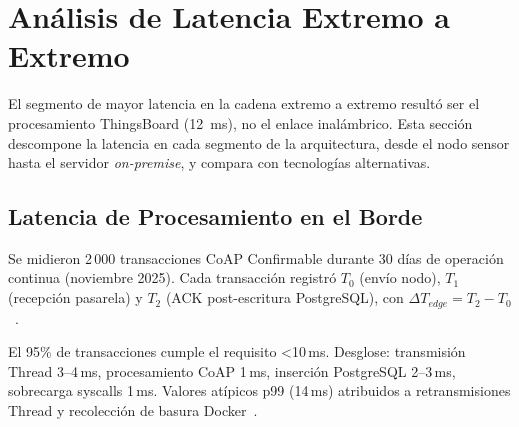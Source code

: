 \section{Análisis de Latencia Extremo a Extremo}
\label{sec:resultados-latencia}

El segmento de mayor latencia en la cadena extremo a extremo resultó ser el procesamiento ThingsBoard (12~ms), no el enlace inalámbrico. Esta sección descompone la latencia en cada segmento de la arquitectura, desde el nodo sensor hasta el servidor \emph{on-premise}, y compara con tecnologías alternativas.



\subsection{Latencia de Procesamiento en el Borde}
\label{sec:resultados-latencia-edge}

Se midieron 2\,000 transacciones CoAP Confirmable durante 30 días de operación continua (noviembre 2025). Cada transacción registró $T_0$ (envío nodo), $T_1$ (recepción pasarela) y $T_2$ (ACK post-escritura PostgreSQL), con $\Delta T_{edge} = T_2 - T_0$~\cite{andriuloEdgeComputingCloud2024}.

\begin{table}[H]
\centering
\caption{Distribución de latencia de procesamiento en el borde ($n=2\,000$, 30 días)}
\label{tab:latencia-edge-percentiles}
\end{table}

El 95\% de transacciones cumple el requisito <10\,ms. Desglose: transmisión Thread 3--4\,ms, procesamiento CoAP 1\,ms, inserción PostgreSQL 2--3\,ms, sobrecarga syscalls 1\,ms. Valores atípicos p99 (14\,ms) atribuidos a retransmisiones Thread y recolección de basura Docker~\cite{huangRealTimeMonitoring2025}.

